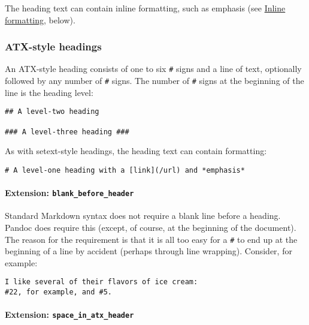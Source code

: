 \documentclass[]{article}
\begin{document}
The heading text can contain inline formatting, such as emphasis (see
\protect\hyperlink{inline-formatting}{Inline formatting}, below).

\hypertarget{atx-style-headings}{%
\subsubsection{ATX-style headings}\label{atx-style-headings}}

An ATX-style heading consists of one to six \texttt{\#} signs and a line
of text, optionally followed by any number of \texttt{\#} signs. The
number of \texttt{\#} signs at the beginning of the line is the heading
level:

\begin{verbatim}
## A level-two heading

### A level-three heading ###
\end{verbatim}

As with setext-style headings, the heading text can contain formatting:

\begin{verbatim}
# A level-one heading with a [link](/url) and *emphasis*
\end{verbatim}

\hypertarget{extension-blank_before_header}{%
\paragraph{\texorpdfstring{Extension:
\texttt{blank\_before\_header}}{Extension: blank\_before\_header}}\label{extension-blank_before_header}}

Standard Markdown syntax does not require a blank line before a heading.
Pandoc does require this (except, of course, at the beginning of the
document). The reason for the requirement is that it is all too easy for
a \texttt{\#} to end up at the beginning of a line by accident (perhaps
through line wrapping). Consider, for example:

\begin{verbatim}
I like several of their flavors of ice cream:
#22, for example, and #5.
\end{verbatim}

\hypertarget{extension-space_in_atx_header}{%
\paragraph{\texorpdfstring{Extension:
\texttt{space\_in\_atx\_header}}{Extension: space\_in\_atx\_header}}\label{extension-space_in_atx_header}}
\end{document}
